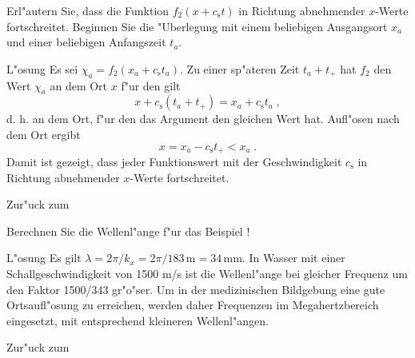 \begin{MExercises}
\begin{MExercise}
Erl"autern Sie, dass die Funktion $f_2(x+c_\mathrm{s}t)$ in Richtung abnehmender $x$-Werte fortschreitet. Beginnen Sie die "Uberlegung mit einem beliebigen Ausgangsort $x_a$ und einer beliebigen Anfangszeit $t_a$.

\begin{MHint}{L"osung}
Es sei $\chi_a = f_2(x_a+c_\mathrm{s}t_a)$. Zu einer sp"ateren Zeit $t_a+t_+$ hat $f_2$ den Wert $\chi_a$ an dem Ort $x$ f"ur den gilt
\begin{equation*}
  x+c_\mathrm{s}(t_a+t_+)=x_a+c_\mathrm{s}t_a\;,
\end{equation*}
d. h. an dem Ort, f"ur den das Argument den gleichen Wert hat. Auf\/l"osen nach dem Ort ergibt
\begin{equation*}
  x=x_a-c_\mathrm{s}t_+<x_a\;.
\end{equation*}
Damit ist gezeigt, dass jeder Funktionswert mit der Geschwindigkeit $c_\mathrm{s}$ in Richtung abnehmender $x$-Werte fortschreitet. 
\end{MHint}

Zur"uck zum 
\end{MExercise}

\begin{MExercise}
Berechnen Sie die Wellenl"ange f"ur das Beispiel !

\begin{MHint}{L"osung} Es gilt $\lambda = 2\pi/k_x = 2\pi/183\,\mathrm{m} = 34\,\mathrm{mm}$. In Wasser mit einer Schallgeschwindigkeit von 1500 m/s ist die Wellenl"ange bei gleicher Frequenz um den Faktor 1500/343 gr"o"ser. Um in der medizinischen Bildgebung eine gute Ortsauf\/l"osung zu erreichen, werden daher Frequenzen im Megahertzbereich eingesetzt, mit entsprechend kleineren Wellenl"angen. \end{MHint}

Zur"uck zum 
\end{MExercise}


\end{MExercises}
